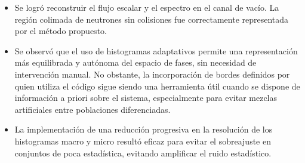 \begin{itemize}
    \item Se logró reconstruir el flujo escalar y el espectro en el canal de vacío. La región colimada de neutrones sin colisiones fue correctamente representada por el método propuesto.

    \item Se observó que el uso de histogramas adaptativos permite una representación más equilibrada y autónoma del espacio de fases, sin necesidad de intervención manual. No obstante, la incorporación de bordes definidos por quien utiliza el código sigue siendo una herramienta útil cuando se dispone de información a priori sobre el sistema, especialmente para evitar mezclas artificiales entre poblaciones diferenciadas.

    \item La implementación de una reducción progresiva en la resolución de los histogramas macro y micro resultó eficaz para evitar el sobreajuste en conjuntos de poca estadística, evitando amplificar el ruido estadístico.
\end{itemize}


